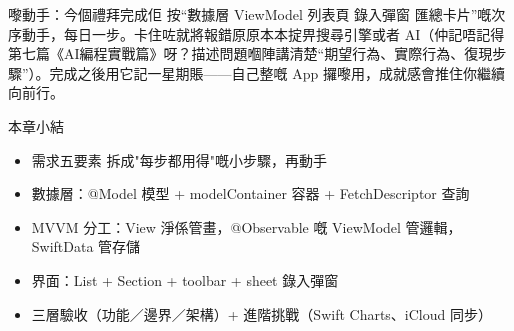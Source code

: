 \begin{tcbpractice}{嚟動手：今個禮拜完成佢}
按“數據層 ViewModel 列表頁 錄入彈窗 匯總卡片”嘅次序動手，每日一步。卡住咗就將報錯原原本本掟畀搜尋引擎或者 AI（仲記唔記得第七篇《AI編程實戰篇》呀？描述問題嗰陣講清楚“期望行為、實際行為、復現步驟”）。完成之後用它記一星期賬——自己整嘅 App 攞嚟用，成就感會推住你繼續向前行。

\end{tcbpractice}

\begin{tcbsummary}{本章小結}
\begin{itemize}
  \item 需求五要素 拆成"每步都用得"嘅小步驟，再動手
  \item 數據層：@Model 模型 + modelContainer 容器 + FetchDescriptor 查詢
  \item MVVM 分工：View 淨係管畫，@Observable 嘅 ViewModel 管邏輯，SwiftData 管存儲
  \item 界面：List + Section + toolbar + sheet 錄入彈窗
  \item 三層驗收（功能／邊界／架構）+ 進階挑戰（Swift Charts、iCloud 同步）
\end{itemize}

\end{tcbsummary}
